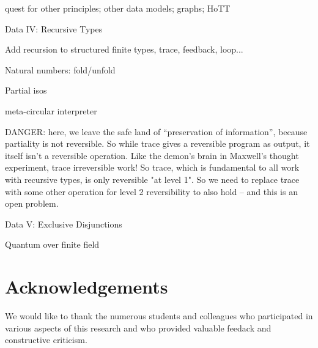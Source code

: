 \documentclass{article}
\begin{document}
quest for other principles; other data models; graphs; HoTT

Data IV: Recursive Types

Add recursion to structured finite types, trace, feedback, loop...

Natural numbers: fold/unfold

Partial isos

meta-circular interpreter
 
DANGER: here, we leave the safe land of ``preservation of information'',
because partiality is not reversible. So while trace gives a reversible
program as output, it itself isn't a reversible operation. Like the
demon's brain in Maxwell's thought experiment, trace irreversible work!
So trace, which is fundamental to all work with recursive types, is
only reversible "at level 1". So we need to replace trace with some other
operation for level 2 reversibility to also hold -- and this is an open
problem.

Data V: Exclusive Disjunctions

Quantum over finite field 

\section*{Acknowledgements} We would like to thank the numerous
students and colleagues who participated in various aspects of this
research and who provided valuable feedack and constructive criticism.



\end{document}
